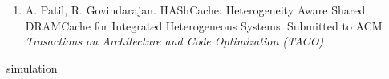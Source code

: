 \documentclass[oneside,12pt]{iiscmastersthesis}
\newcommand{\blankpage}{
\newpage
\thispagestyle{empty}
\mbox{}
\newpage
}
\newcommand{\blankpagewithnumber}{
\newpage
\mbox{}
\newpage
}
\begin{document}

\setcounter{secnumdepth}{3}
\setcounter{tocdepth}{3}

\frontmatter %


% 



\begin{enumerate}
	\item A. Patil, R. Govindarajan. HAShCache: Heterogeneity Aware Shared DRAMCache for Integrated Heterogeneous Systems. Submitted to ACM \textit{Trasactions on Architecture and Code Optimization (TACO)}
\end{enumerate}


\blankpage




\tableofcontents
\blankpagewithnumber
\listoffigures
\listoftables



\mainmatter %
\setcounter{page}{1}

 {simulation}







% 
% 


%
%

\end{document}

